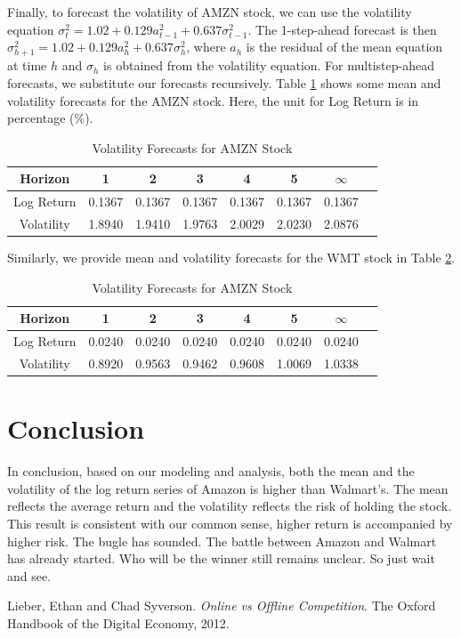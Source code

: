 \documentclass[paper=a4, fontsize=11pt]{article}
\begin{document}
Finally, to forecast the volatility of AMZN stock, we can use the volatility equation $\sigma_t^2 = 1.02+0.129a_{t-1}^2+0.637\sigma_{t-1}^2$. The 1-step-ahead forecast is then $\sigma_{h+1}^2 = 1.02+0.129a_h^2+0.637\sigma_h^2$, where $a_h$ is the residual of the mean equation at time $h$ and $\sigma_h$ is obtained from the volatility equation. For multistep-ahead forecasts, we substitute our forecasts recursively. Table \ref{fc_amzn} shows some mean and volatility forecasts for the AMZN stock. Here, the unit for Log Return is in percentage (\%).

\begin{table}
\caption{Volatility Forecasts for AMZN Stock}
  \centering
\begin{tabular}[!htbp]{c|ccccccc}
\hline Horizon & 1 & 2 & 3 & 4 & 5 & $\infty$ \\ 
\hline Log Return & 0.1367 & 0.1367 & 0.1367 & 0.1367 & 0.1367 & 0.1367 \\
Volatility & 1.8940 & 1.9410 & 1.9763 &  2.0029 & 2.0230 & 2.0876\\
\hline
\end{tabular}
\label{fc_amzn}
\end{table}

Similarly, we provide mean and volatility forecasts for the WMT stock in Table \ref{fc_wmt}.
\begin{table}
\caption{Volatility Forecasts for AMZN Stock}
  \centering
\begin{tabular}[!htbp]{c|ccccccc}
\hline Horizon & 1 & 2 & 3 & 4 & 5 & $\infty$ \\ 
\hline Log Return & 0.0240 & 0.0240 & 0.0240 & 0.0240 & 0.0240 & 0.0240 \\
Volatility & 0.8920 & 0.9563 & 0.9462 & 0.9608 & 1.0069 & 1.0338\\
\hline
\end{tabular}
\label{fc_wmt}
\end{table}


\section{Conclusion}
In conclusion, based on our modeling and analysis, both the mean and the volatility of the log return series of Amazon is higher than Walmart’s. The mean reflects the average return and the volatility reflects the risk of holding the stock. This result is consistent with our common sense, higher return is accompanied by higher risk.  
The bugle has sounded. The battle between Amazon and Walmart has already started. Who will be the winner still remains unclear. So just wait and see.

\begin{thebibliography}{99}
Lieber, Ethan and Chad Syverson. 
\textit{Online vs Offline Competition}. 
The Oxford Handbook of the Digital Economy, 2012.
\end{thebibliography}
\end{document}
